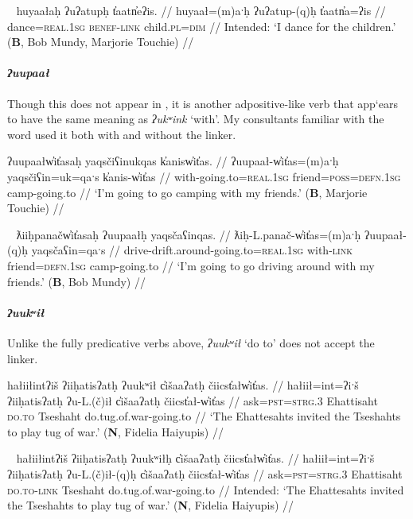 \ex~ \label{ex:uatuph2}
\begingl
\glpreamble *huyaałaḥ ʔuʔatupḥ t̓aatn̓eʔis. //
\gla huyaał=(m)aˑḥ ʔuʔatup-(q)ḥ t̓aatn̓a=ʔis //
\glb dance=\textsc{real.1sg} \textsc{benef}-\textsc{link} child.\textsc{pl}=\textsc{dim} //
\glft Intended: `I dance for the children.' (\textbf{B}, Bob Mundy, Marjorie Touchie) //
\endgl
\xe

\paragraph{\textit{ʔuupaał}} Though this does not appear in \cite{woo2007b}, it is another adpositive-like verb that app`ears to have the same meaning as \textit{ʔukʷink} `with'. My consultants familiar with the word used it both with and without the linker.

\ex \label{ex:uupaal}
\begingl
\glpreamble ʔuupaałw̓it̓asaḥ yaqsčiʕinukqas k̓anisw̓it̓as. //
\gla ʔuupaał-w̓it̓as=(m)aˑḥ yaqsčiʕin=uk=qaˑs k̓anis-w̓it̓as //
\glb with-going.to=\textsc{real.1sg} friend=\textsc{poss}=\textsc{defn.1sg} camp-going.to //
\glft `I'm going to go camping with my friends.' (\textbf{B}, Marjorie Touchie) //
\endgl
\xe

\ex~ \label{ex:uupaalh}
\begingl
\glpreamble ƛiiḥpanačw̓it̓asaḥ ʔuupaałḥ yaqsčaʕinqas. //
\gla ƛiḥ-L.panač-w̓it̓as=(m)aˑḥ ʔuupaał-(q)ḥ yaqsčaʕin=qaˑs //
\glb drive-drift.around-going.to=\textsc{real.1sg} with-\textsc{link} friend=\textsc{defn.1sg} camp-going.to //
\glft `I'm going to go driving around with my friends.' (\textbf{B}, Bob Mundy) //
\endgl
\xe

\paragraph{\textit{ʔuukʷił}} \label{sec:link:uukwil} Unlike the fully predicative verbs above, \textit{ʔuukʷił} `do to' does not accept the linker.

\ex \label{ex:tugofwar1}
\begingl
\glpreamble hałiiłintʔiš ʔiiḥatisʔatḥ ʔuukʷił c̓išaaʔatḥ čiicst̓ałw̓it̓as. //
\gla hałiił=int=ʔiˑš ʔiiḥatisʔatḥ ʔu-L.(č)ił c̓išaaʔatḥ čiicst̓ał-w̓it̓as //
\glb ask=\textsc{pst}=\textsc{strg.3} Ehattisaht \textsc{do.to} Tseshaht do.tug.of.war-going.to //
\glft `The Ehattesahts invited the Tseshahts to play tug of war.' (\textbf{N}, Fidelia Haiyupis) //
\endgl
\xe

\ex~ \label{ex:tugofwar2}
\begingl
\glpreamble *hałiiłintʔiš ʔiiḥatisʔatḥ ʔuukʷiłḥ c̓išaaʔatḥ čiicst̓ałw̓it̓as. //
\gla hałiił=int=ʔiˑš ʔiiḥatisʔatḥ ʔu-L.(č)ił-(q)ḥ c̓išaaʔatḥ čiicst̓ał-w̓it̓as //
\glb ask=\textsc{pst}=\textsc{strg.3} Ehattisaht \textsc{do.to}-\textsc{link} Tseshaht do.tug.of.war-going.to //
\glft Intended: `The Ehattesahts invited the Tseshahts to play tug of war.' (\textbf{N}, Fidelia Haiyupis) //
\endgl
\xe


